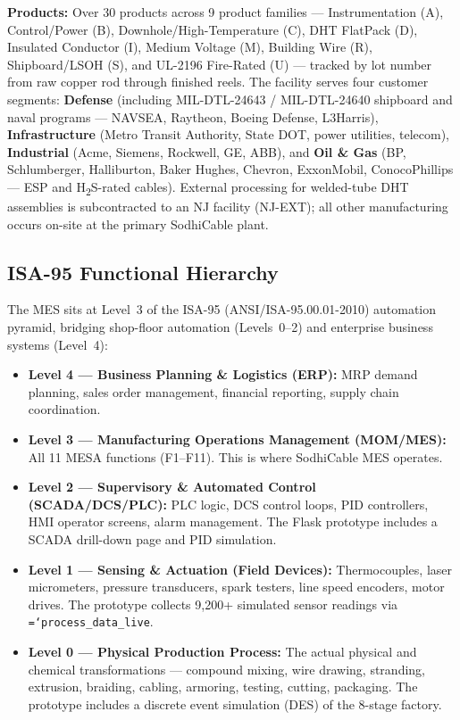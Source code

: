 \documentclass[11pt]{article}
\newcommand{\tfield}[1]{\texttt{\hyphenchar\font=`\-\relax #1}}
\begin{document}
\textbf{Products:} Over 30 products across 9 product families --- Instrumentation (A), Control/Power (B), Downhole/High-Temperature (C), DHT FlatPack (D), Insulated Conductor (I), Medium Voltage (M), Building Wire (R), Shipboard/LSOH (S), and UL-2196 Fire-Rated (U) --- tracked by lot number from raw copper rod through finished reels.  The facility serves four customer segments: \textbf{Defense} (including MIL-DTL-24643 / MIL-DTL-24640 shipboard and naval programs --- NAVSEA, Raytheon, Boeing Defense, L3Harris), \textbf{Infrastructure} (Metro Transit Authority, State DOT, power utilities, telecom), \textbf{Industrial} (Acme, Siemens, Rockwell, GE, ABB), and \textbf{Oil \& Gas} (BP, Schlumberger, Halliburton, Baker Hughes, Chevron, ExxonMobil, ConocoPhillips --- ESP and H\textsubscript{2}S-rated cables).  External processing for welded-tube DHT assemblies is subcontracted to an NJ facility (NJ-EXT); all other manufacturing occurs on-site at the primary SodhiCable plant.

\subsection{ISA-95 Functional Hierarchy}

The MES sits at Level~3 of the ISA-95 (ANSI/ISA-95.00.01-2010) automation pyramid, bridging shop-floor automation (Levels~0--2) and enterprise business systems (Level~4):

\begin{itemize}[leftmargin=2em, itemsep=1pt]
\item \textbf{Level 4 --- Business Planning \& Logistics (ERP):} MRP demand planning, sales order management, financial reporting, supply chain coordination.
\item \textbf{Level 3 --- Manufacturing Operations Management (MOM/MES):} All 11 MESA functions (F1--F11). This is where SodhiCable MES operates.
\item \textbf{Level 2 --- Supervisory \& Automated Control (SCADA/DCS/PLC):} PLC logic, DCS control loops, PID controllers, HMI operator screens, alarm management. The Flask prototype includes a SCADA drill-down page and PID simulation.
\item \textbf{Level 1 --- Sensing \& Actuation (Field Devices):} Thermocouples, laser micrometers, pressure transducers, spark testers, line speed encoders, motor drives. The prototype collects 9{,}200+ simulated sensor readings via \tfield{process\_data\_live}.
\item \textbf{Level 0 --- Physical Production Process:} The actual physical and chemical transformations --- compound mixing, wire drawing, stranding, extrusion, braiding, cabling, armoring, testing, cutting, packaging. The prototype includes a discrete event simulation (DES) of the 8-stage factory.
\end{itemize}
\end{document}
